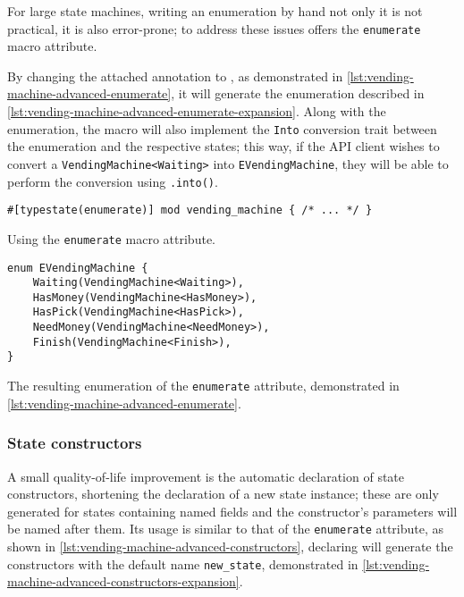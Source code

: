 For large state machines, writing an enumeration by hand not only it is not practical, it is also error-prone;
to address these issues  offers the \texttt{enumerate} macro attribute.

By changing the attached  annotation to ,
as demonstrated in \autoref{lst:vending-machine-advanced-enumerate},
it will generate the enumeration described in \autoref{lst:vending-machine-advanced-enumerate-expansion}.
Along with the enumeration, the macro will also implement the \texttt{Into} conversion trait between the enumeration and the respective states;
this way, if the API client wishes to convert a \texttt{VendingMachine<Waiting>} into \texttt{EVendingMachine},
they will be able to perform the conversion using \texttt{.into()}.

\begin{listing}
    \begin{verbatim}
#[typestate(enumerate)] mod vending_machine { /* ... */ }
    \end{verbatim}
    \caption{Using the \texttt{enumerate} macro attribute.}
    \label{lst:vending-machine-advanced-enumerate}
\end{listing}

\begin{listing}
    \begin{verbatim}
enum EVendingMachine {
    Waiting(VendingMachine<Waiting>),
    HasMoney(VendingMachine<HasMoney>),
    HasPick(VendingMachine<HasPick>),
    NeedMoney(VendingMachine<NeedMoney>),
    Finish(VendingMachine<Finish>),
}
    \end{verbatim}
    \caption{The resulting enumeration of the \texttt{enumerate} attribute, demonstrated in \autoref{lst:vending-machine-advanced-enumerate}.}
    \label{lst:vending-machine-advanced-enumerate-expansion}
\end{listing}

\subsubsection{State constructors}

A small quality-of-life improvement is the automatic declaration of state constructors,
shortening the declaration of a new state instance;
these are only generated for states containing named fields and
the constructor's parameters will be named after them. %
Its usage is similar to that of the \texttt{enumerate} attribute, as shown in \autoref{lst:vending-machine-advanced-constructors},
declaring  will generate the constructors with the default name \texttt{new\_state},
demonstrated in \autoref{lst:vending-machine-advanced-constructors-expansion}.

